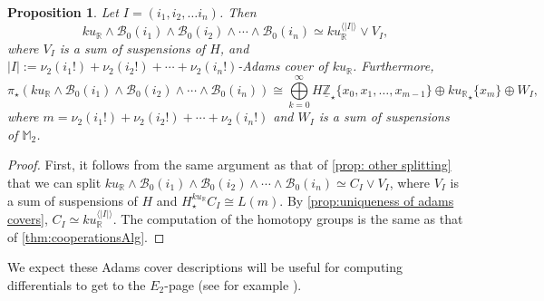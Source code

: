 \documentclass{amsart}
\newtheorem{proposition}[equation]{Proposition}
\theoremstyle{plain}
\numberwithin{equation}{section}
\numberwithin{figure}{section}
\newcommand{\mM}{{\mathbb M}}
\newcommand{\mR}{{\mathbb R}}
\newcommand{\mZ}{{\mathbb Z}}
\newcommand{\cB}{{\mathcal B}}
\newcommand{\umZ}{\underline{\mZ}}
\newcommand{\0}{\langle 0 \rangle }
\begin{document}
\begin{proposition}
    Let $I = (i_{1}, i_{2}, \ldots i_{n})$. Then \[ ku_{\mR}\wedge \cB_{0}(i_{1}) \wedge \cB_{0}(i_{2}) \wedge \cdots \wedge \cB_{0}(i_{n})  \simeq ku_{\mR}^{\langle |I| \rangle} \vee V_{I},\]
where $V_{I}$ is a sum of suspensions of $H$, and $|I| := \nu_{2}(i_{1}!) + \nu_{2}(i_{2}!) + \cdots + \nu_{2}(i_{n}!)$-Adams cover of $ku_{\mR}$. Furthermore, 
\[ \pi_{\star}\left( ku_{\mR}\wedge \cB_{0}(i_{1}) \wedge \cB_{0}(i_{2}) \wedge \cdots \wedge \cB_{0}(i_{n})  \right) \cong  \bigoplus\limits_{k=0}^{\infty} H \umZ_{\star}\{x_{0}, x_{1}, \ldots, x_{m-1} \} \oplus {ku_\mathbb{R}}_{\star}\{x_{m} \} \oplus W_{I},\]
where $m = \nu_{2}(i_{1}!) + \nu_{2}(i_{2}!) + \cdots + \nu_{2}(i_{n}!)$ and $W_{I}$ is a sum of suspensions of $\mM_{2}$.
\end{proposition}
\begin{proof}
First, it follows from the same argument as that of \cref{prop: other splitting} that we can split $ku_{\mR}\wedge \cB_{0}(i_{1}) \wedge \cB_{0}(i_{2}) \wedge \cdots \wedge \cB_{0}(i_{n})  \simeq C_{I} \vee V_{I}$, where $V_{I}$ is a sum of suspensions of $H$ and $H_{\star}^{ku_{\mR}}C_{I} \cong L(m)$. By \cref{prop:uniqueness of adams covers}, $C_{I} \simeq ku_{\mR}^{\langle |I| \rangle}$.  The computation of the homotopy groups is the same as that of \cref{thm:cooperationsAlg}.
\end{proof}

We expect these Adams cover descriptions will be useful for computing differentials to get to the $E_{2}$-page (see for example \cite{BeaudryBehrensBattacharyaCulverXu20}).


\printbibliography
\end{document}
